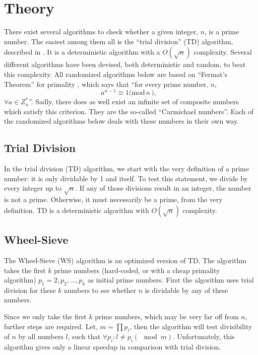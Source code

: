 \section{Theory}
There exist several algorithms to check whether a given integer, $n$, is a prime number.
The easiest among them all is the ``trial division'' (TD) algorithm, described in .
It is a deterministic algorithm with a $O(\sqrt{n})$ complexity.
Several different algorithms have been devised, both deterministic and random, to beat this complexity.
All randomized algorithms below are based on ``Fermat's Theorem'' for primality \cite{book:RA}, which says that ``for every prime number, $n$,
\begin{equation}
	a^{n-1} \equiv 1 \mathrm{(mod}\, n\, \mathrm{)},
\end{equation}
$\forall a \in Z_n^*$''.
Sadly, there does as well exist an infinite set of composite numbers which satisfy this criterion.
They are the so-called ``Carmichael numbers''.
Each of the randomized algorithms below deals with these numbers in their own way.

\subsection{Trial Division} \label{sec:TD_theory}
In the trial division (TD) algorithm, we start with the very definition of a prime number: it is only dividable by 1 and itself.
To test this statement, we divide by every integer up to $\sqrt{n}$.
If any of those divisions result in an integer, the number is not a prime.
Otherwise, it must necessarily be a prime, from the very definition.
TD is a deterministic algorithm with $O(\sqrt{n})$ complexity.

\subsection{Wheel-Sieve} \label{sec:WS_theory}
The Wheel-Sieve (WS) algorithm is an optimized version of TD.
The algorithm takes the first $k$ prime numbers (hard-coded, or with a cheap primality algorithm) $p_1=2, p_2, \ldots, p_k$ as initial prime numbers.
First the algorithm uses trial division for these $k$ numbers to see whether $n$ is dividable by any of these numbers.

Since we only take the first $k$ prime numbers, which may be very far off from $n$, further steps are required.
Let, $m = \prod p_i$,
then the algorithm will test divisibility of $n$ by all numbers $l$, such that $\forall p_i: l \neq p_i (\mod m)$.
Unfortunately, this algorithm gives only a linear speedup in comparison with trial division.

